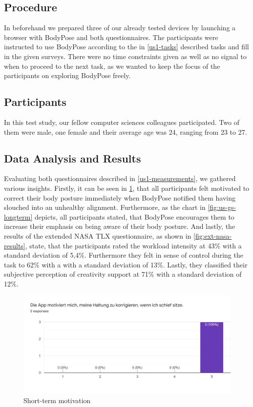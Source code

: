 \subsection{Procedure}
\label{us1-procedure}
In beforehand we prepared three of our already tested devices by launching a browser with BodyPose and both questionnaires.
The participants were instructed to use BodyPose according to the in \ref{us1-tasks} described tasks and fill in the given surveys. There were no time constraints given as well as no signal to when to proceed to the next task, as we wanted to keep the focus of the participants on exploring BodyPose freely.
  

\subsection{Participants}
\label{us1-participants}
In this test study, our fellow computer sciences colleagues participated. Two of them were male, one female and their average age was 24, ranging from 23 to 27.


\subsection{Data Analysis and Results}
\label{us1-data-analysis-results}
Evaluating both questionnaires described in \ref{us1-measurements}, we gathered various insights.
Firstly, it can be seen in \ref{fig:us-gs-shortterm}, that all participants felt motivated to correct their body posture immediately when BodyPose notified them having slouched into an unhealthy alignment.
Furthermore, as the chart in \ref{fig:us-gs-longterm} depicts, all participants stated, that BodyPose encourages them to increase their emphasis on being aware of their body posture.
And lastly, the results of the extended NASA TLX questionnaire, as shown in \ref{fig:ext-nasa-results}, state, that the participants rated the workload intensity at 43\% with a standard deviation of 5,4\%. Furthermore they felt in sense of control during the task to 62\% with a with a standard deviation of 13\%. Lastly, they classified their subjective perception of creativity support at 71\% with a standard deviation of 12\%.

\begin{figure}[hbp]
\centering
\includegraphics[width=\linewidth]{media/us-gs-shortterm-motivation-results.png}    
\caption{Short-term motivation}
\label{fig:us-gs-shortterm}
\end{figure}

